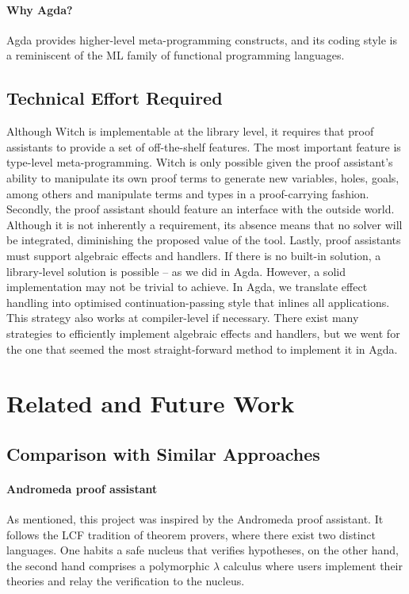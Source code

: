 \documentclass[sigconfl]{acmart}
\begin{document}
\paragraph{Why Agda?} Agda provides higher-level meta-programming constructs, and
its coding style is a reminiscent of the ML family of functional programming languages.

\subsection{Technical Effort Required} \label{tech-details}

Although Witch is implementable at the library level, it requires that proof
assistants to provide a set of off-the-shelf features. The most important
feature is type-level meta-programming. Witch is only possible given the proof
assistant's ability to manipulate its own proof terms to generate new variables,
holes, goals, among others and manipulate terms and types in a proof-carrying
fashion. Secondly, the proof assistant should feature an interface with the
outside world. Although it is not inherently a requirement, its absence means
that no solver will be integrated, diminishing the proposed value of the tool.
Lastly, proof assistants must support algebraic effects and handlers. If there
is no built-in solution, a library-level solution is possible -- as we did in
Agda. However, a solid implementation may not be trivial to achieve. In Agda,
we translate effect handling into optimised continuation-passing style that inlines
all applications. This strategy also works at compiler-level if necessary. There exist
many strategies to efficiently implement algebraic effects and handlers, but we
went for the one that seemed the most straight-forward method to implement it in Agda.

\section{Related and Future Work}

\subsection{Comparison with Similar Approaches}

\paragraph{Andromeda proof assistant} As mentioned, this project was inspired by the
Andromeda proof assistant. It follows the LCF tradition of theorem provers,
where there exist two distinct languages. One habits a safe nucleus that
verifies hypotheses, on the other hand, the second hand comprises a polymorphic
$\lambda$ calculus where users implement their theories and relay the
verification to the nucleus.
\end{document}
